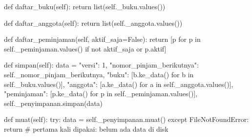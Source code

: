 \begin{kode}
    def daftar_buku(self):
        return list(self._buku.values())

    def daftar_anggota(self):
        return list(self._anggota.values())

    def daftar_peminjaman(self, aktif_saja=False):
        return [p for p in self._peminjaman.values()
                if not aktif_saja or p.aktif]

    def simpan(self):
        data = {
            "versi": 1,
            "nomor_pinjam_berikutnya": self._nomor_pinjam_berikutnya,
            "buku": [b.ke_data() for b in self._buku.values()],
            "anggota": [a.ke_data() for a in self._anggota.values()],
            "peminjaman": [p.ke_data() for p in self._peminjaman.values()],
        }
        self._penyimpanan.simpan(data)

    def muat(self):
        try:
            data = self._penyimpanan.muat()
        except FileNotFoundError:
            return  # pertama kali dipakai: belum ada data di disk


\end{kode}
